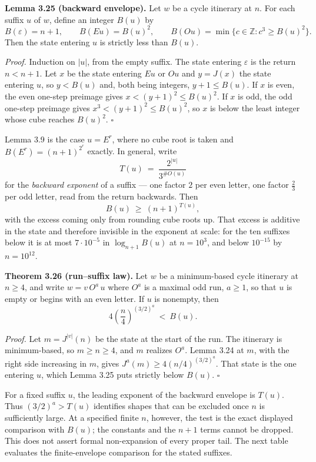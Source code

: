 \documentclass[12pt]{article}
\begin{document}
\textbf{Lemma 3.25 (backward envelope).} Let \(w\) be a cycle itinerary
at \(n\). For each suffix \(u\) of \(w\), define an integer \(B(u)\) by
\[
B(\varepsilon)=n+1,\qquad
B(Eu)=B(u)^2,\qquad
B(Ou)=\min\{c\in\mathbb Z: c^3\ge B(u)^2\}.
\] Then the state entering \(u\) is strictly less than \(B(u)\).

\emph{Proof.} Induction on \(|u|\), from the empty suffix. The state
entering \(\varepsilon\) is the return \(n<n+1\). Let \(x\) be the state
entering \(Eu\) or \(Ou\) and \(y=J(x)\) the state entering \(u\), so
\(y<B(u)\) and, both being integers, \(y+1\le B(u)\). If \(x\) is even,
the even one-step preimage gives \(x<(y+1)^2\le B(u)^2\). If \(x\) is
odd, the odd one-step preimage gives \(x^3<(y+1)^2\le B(u)^2\), so \(x\)
is below the least integer whose cube reaches \(B(u)^2\). \(\square\)

Lemma 3.9 is the case \(u=E^r\), where no cube root is taken and
\(B(E^r)=(n+1)^{2^r}\) exactly. In general, write \[
T(u)\ =\ \frac{2^{|u|}}{3^{\#O(u)}}
\] for the \emph{backward exponent} of a suffix --- one factor \(2\) per
even letter, one factor \(\tfrac23\) per odd letter, read from the
return backwards. Then \[
B(u)\ \ge\ (n+1)^{T(u)},
\] with the excess coming only from rounding cube roots up. That excess
is additive in the state and therefore invisible in the exponent at
scale: for the ten suffixes below it is at most \(7\cdot 10^{-5}\) in
\(\log_{n+1}B(u)\) at \(n=10^3\), and below \(10^{-15}\) by
\(n=10^{12}\).

\textbf{Theorem 3.26 (run--suffix law).} Let \(w\) be a minimum-based
cycle itinerary at \(n\ge 4\), and write \(w=v\,O^a\,u\) where \(O^a\)
is a maximal odd run, \(a\ge 1\), so that \(u\) is empty or begins with
an even letter. If \(u\) is nonempty, then \[
4\left(\frac n4\right)^{(3/2)^a}\ <\ B(u).
\]

\emph{Proof.} Let \(m=J^{|v|}(n)\) be the state at the start of the run.
The itinerary is minimum-based, so \(m\ge n\ge 4\), and \(m\) realizes
\(O^a\). Lemma 3.24 at \(m\), with the right side increasing in \(m\),
gives \(J^a(m)\ge 4(n/4)^{(3/2)^a}\). That state is the one entering
\(u\), which Lemma 3.25 puts strictly below \(B(u)\). \(\square\)

For a fixed suffix \(u\), the leading exponent of the backward envelope
is \(T(u)\). Thus \((3/2)^a>T(u)\) identifies shapes that can be
excluded once \(n\) is sufficiently large. At a specified finite \(n\),
however, the test is the exact displayed comparison with \(B(u)\); the
constants and the \(n+1\) terms cannot be dropped. This does not assert
formal non-expansion of every proper tail. The next table evaluates the
finite-envelope comparison for the stated suffixes.
\end{document}
